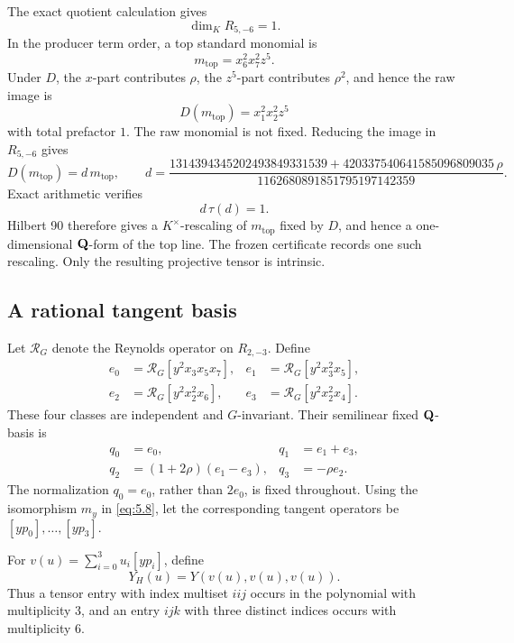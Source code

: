 The exact quotient calculation gives
\[
 \dim_KR_{5,-6}=1.                                  \tag{6.6}
\]
In the producer term order, a top standard monomial is
\[
 m_{\mathrm{top}}=x_6^2x_7^2z^5.
\]
Under \(D\), the \(x\)-part contributes \(\rho\), the \(z^5\)-part
contributes \(\rho^2\), and hence the raw image is
\[
 D(m_{\mathrm{top}})=x_1^2x_2^2z^5                \tag{6.7}
\]
with total prefactor \(1\).  The raw monomial is not fixed.  Reducing the
image in \(R_{5,-6}\) gives
\[
 D(m_{\mathrm{top}})=d\,m_{\mathrm{top}},\qquad
 d=\frac{
 1314394345202493849331539+
 420337540641585096809035\,\rho}
 {1162680891851795197142359}.                      \tag{6.8}
\]
Exact arithmetic verifies
\[
 d\,\tau(d)=1.                                     \tag{6.9}
\]
Hilbert 90 therefore gives a \(K^\times\)-rescaling of
\(m_{\mathrm{top}}\) fixed by \(D\), and hence a one-dimensional
\(\mathbf Q\)-form of the top line.  The frozen certificate records one such
rescaling.  Only the resulting projective tensor is intrinsic.

\subsection{A rational tangent basis}

Let \(\mathcal R_G\) denote the Reynolds operator on \(R_{2,-3}\).  Define
\[
\begin{aligned}
e_0&=\mathcal R_G[y^2x_3x_5x_7],&
e_1&=\mathcal R_G[y^2x_3^2x_5],\\
e_2&=\mathcal R_G[y^2x_2^2x_6],&
e_3&=\mathcal R_G[y^2x_2^2x_4].
\end{aligned}                                      \tag{6.10}
\]
These four classes are independent and \(G\)-invariant.  Their semilinear
fixed \(\mathbf Q\)-basis is
\[
\begin{aligned}
q_0&=e_0,&
q_1&=e_1+e_3,\\
q_2&=(1+2\rho)(e_1-e_3),&
q_3&=-\rho e_2.
\end{aligned}                                      \tag{6.11}
\label{eq:6.11}
\]
The normalization \(q_0=e_0\), rather than \(2e_0\), is fixed throughout.
Using the isomorphism \(m_y\) in \cref{eq:5.8}, let the corresponding
tangent operators be \([yp_0],\ldots,[yp_3]\).

For \(v(u)=\sum_{i=0}^3u_i[yp_i]\), define
\[
 Y_H(u)=Y(v(u),v(u),v(u)).
\]
Thus a tensor entry with index multiset \(iij\) occurs in the polynomial
with multiplicity \(3\), and an entry \(ijk\) with three distinct indices
occurs with multiplicity \(6\).

